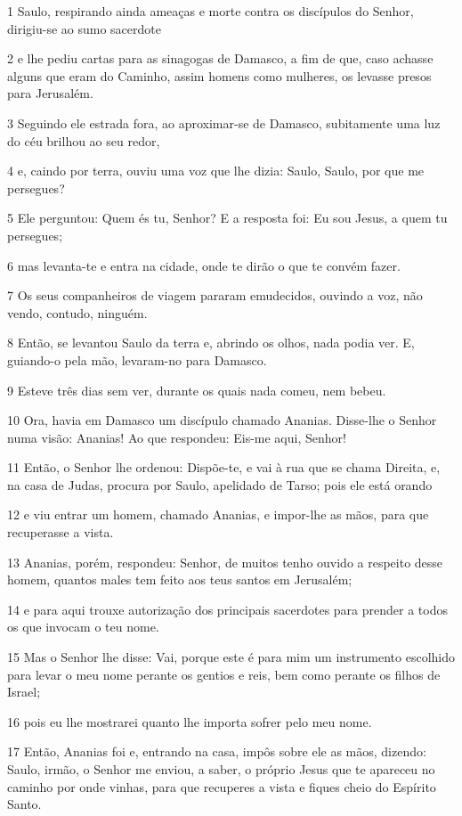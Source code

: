 \par 1 Saulo, respirando ainda ameaças e morte contra os discípulos do Senhor, dirigiu-se ao sumo sacerdote
\par 2 e lhe pediu cartas para as sinagogas de Damasco, a fim de que, caso achasse alguns que eram do Caminho, assim homens como mulheres, os levasse presos para Jerusalém.
\par 3 Seguindo ele estrada fora, ao aproximar-se de Damasco, subitamente uma luz do céu brilhou ao seu redor,
\par 4 e, caindo por terra, ouviu uma voz que lhe dizia: Saulo, Saulo, por que me persegues?
\par 5 Ele perguntou: Quem és tu, Senhor? E a resposta foi: Eu sou Jesus, a quem tu persegues;
\par 6 mas levanta-te e entra na cidade, onde te dirão o que te convém fazer.
\par 7 Os seus companheiros de viagem pararam emudecidos, ouvindo a voz, não vendo, contudo, ninguém.
\par 8 Então, se levantou Saulo da terra e, abrindo os olhos, nada podia ver. E, guiando-o pela mão, levaram-no para Damasco.
\par 9 Esteve três dias sem ver, durante os quais nada comeu, nem bebeu.
\par 10 Ora, havia em Damasco um discípulo chamado Ananias. Disse-lhe o Senhor numa visão: Ananias! Ao que respondeu: Eis-me aqui, Senhor!
\par 11 Então, o Senhor lhe ordenou: Dispõe-te, e vai à rua que se chama Direita, e, na casa de Judas, procura por Saulo, apelidado de Tarso; pois ele está orando
\par 12 e viu entrar um homem, chamado Ananias, e impor-lhe as mãos, para que recuperasse a vista.
\par 13 Ananias, porém, respondeu: Senhor, de muitos tenho ouvido a respeito desse homem, quantos males tem feito aos teus santos em Jerusalém;
\par 14 e para aqui trouxe autorização dos principais sacerdotes para prender a todos os que invocam o teu nome.
\par 15 Mas o Senhor lhe disse: Vai, porque este é para mim um instrumento escolhido para levar o meu nome perante os gentios e reis, bem como perante os filhos de Israel;
\par 16 pois eu lhe mostrarei quanto lhe importa sofrer pelo meu nome.
\par 17 Então, Ananias foi e, entrando na casa, impôs sobre ele as mãos, dizendo: Saulo, irmão, o Senhor me enviou, a saber, o próprio Jesus que te apareceu no caminho por onde vinhas, para que recuperes a vista e fiques cheio do Espírito Santo.
